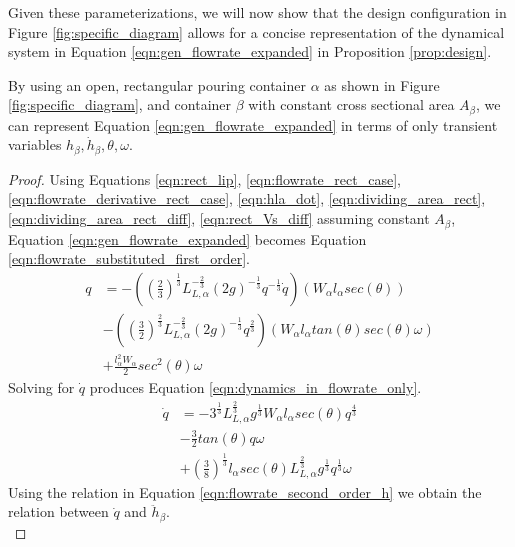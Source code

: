 Given these parameterizations, we will now show that the design configuration in Figure \ref{fig:specific_diagram} allows for a concise representation of the dynamical system in Equation \eqref{eqn:gen_flowrate_expanded} in Proposition \eqref{prop:design}.
\begin{proposition}\label{prop:design}
By using an open, rectangular pouring container $\alpha$ as shown in Figure \ref{fig:specific_diagram}, and container $\beta$ with constant cross sectional area $A_{\beta}$, we can represent Equation \eqref{eqn:gen_flowrate_expanded} in terms of only transient variables $h_{\beta}, \dot{h}_{\beta}, \theta, \omega$.
\end{proposition}
\begin{proof}
Using Equations \eqref{eqn:rect_lip}, \eqref{eqn:flowrate_rect_case}, \eqref{eqn:flowrate_derivative_rect_case}, \eqref{eqn:hla_dot}, \eqref{eqn:dividing_area_rect}, \eqref{eqn:dividing_area_rect_diff}, \eqref{eqn:rect_Vs_diff} assuming constant $A_{\beta}$, Equation \eqref{eqn:gen_flowrate_expanded} becomes Equation \eqref{eqn:flowrate_substituted_first_order}. 
\begin{align}
q&= - \left( \left( \frac{2}{3} \right)^{\frac{1}{3}} L_{L,\alpha}^{-\frac{2}{3}} (2g)^{-\frac{1}{3}} q^{-\frac{1}{3}} \dot{q} \right) \left(  W_{\alpha} l_{\alpha} sec(\theta)  \right) \nonumber \\
&- \left( \left( \frac{3}{2} \right)^{\frac{2}{3}} L_{L,\alpha}^{-\frac{2}{3}} (2g)^{-\frac{1}{3}} q^{\frac{2}{3}} \right) \left( W_{\alpha} l_{\alpha} tan(\theta) sec(\theta) \omega \right) \nonumber \\
&+ \frac{l_{\alpha}^2 W_{\alpha}}{2} sec^2(\theta) \omega \label{eqn:flowrate_substituted_first_order}
\end{align}
Solving for $\dot{q}$ produces Equation \eqref{eqn:dynamics_in_flowrate_only}.
\begin{align}
\dot{q} &= - 3^{\frac{1}{3}} L_{L,\alpha}^{\frac{2}{3}} g^{\frac{1}{3}}  W_{\alpha} l_{\alpha} sec(\theta) q^{\frac{4}{3}} \nonumber \\
&- \frac{3}{2} tan(\theta) q \omega \nonumber \\
&+ \left( \frac{3}{8} \right)^{\frac{1}{3}}  l_{\alpha} sec(\theta) L_{L,\alpha}^{\frac{2}{3}} g^{\frac{1}{3}} q^{\frac{1}{3}} \omega \label{eqn:dynamics_in_flowrate_only}
\end{align}
Using the relation in Equation \eqref{eqn:flowrate_second_order_h} we obtain the relation between $\dot{q}$ and $\ddot{h}_{\beta}$.
\begin{equation}

\end{equation}
\end{proof}
